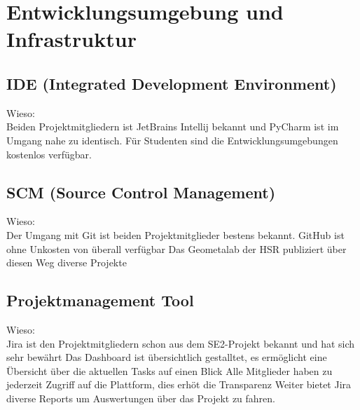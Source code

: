 \section{Entwicklungsumgebung und Infrastruktur}
\subsection{IDE (Integrated Development Environment)}
Wieso:\\		
Beiden Projektmitgliedern ist JetBrains Intellij bekannt und PyCharm ist im Umgang nahe zu identisch.
Für Studenten sind die Entwicklungsumgebungen kostenlos verfügbar.
\subsection{SCM (Source Control Management)}
Wieso:\\
Der Umgang mit Git ist beiden Projektmitglieder bestens bekannt.
GitHub ist ohne Unkosten von überall verfügbar
Das Geometalab der HSR publiziert über diesen Weg diverse Projekte
\subsection{Projektmanagement Tool}
Wieso:\\
Jira ist den Projektmitgliedern schon aus dem SE2-Projekt bekannt und hat sich sehr bewährt
Das Dashboard ist übersichtlich gestalltet, es ermöglicht eine Übersicht über die aktuellen Tasks auf einen Blick
Alle Mitglieder haben zu jederzeit Zugriff auf die Plattform, dies erhöt die Transparenz
Weiter bietet Jira diverse Reports um Auswertungen über das Projekt zu fahren.
